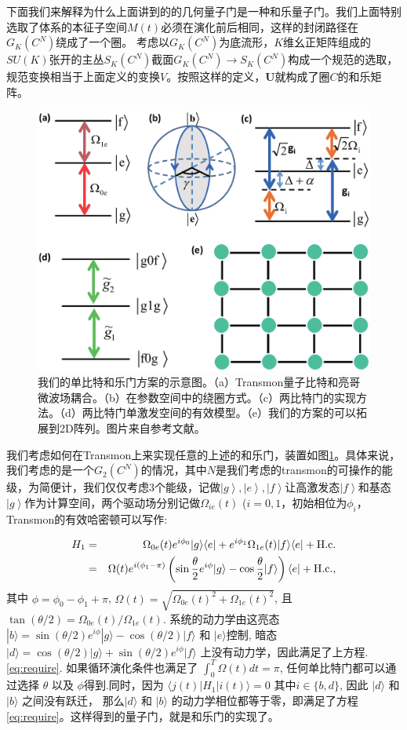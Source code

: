 \documentclass[supercite]{HustGraduPaper}
\newcommand{\ket}[1]{\left| #1 \right\rangle}
\begin{document}
下面我们来解释为什么上面讲到的的几何量子门是一种和乐量子门。我们上面特别选取了体系的本征子空间$M(t)$必须在演化前后相同，这样的封闭路径在$G_K(C^N)$绕成了一个圈。
考虑以$G_K(C^N)$为底流形，$K$维幺正矩阵组成的$SU(K)$张开的主丛$S_K(C^N)$截面$G_K(C^N)\to S_K(C^N)$构成一个规范的选取，规范变换相当于上面定义的变换$V$。按照这样的定义，$\mathbf{U}$就构成了圈$C$的和乐矩阵。
\begin{figure}
	\centering
	\includegraphics[width=0.7\linewidth]{Figures/transmon/setupnew}
	\caption{我们的单比特和乐门方案的示意图。（a）Transmon量子比特和亮哥微波场耦合。（b）在参数空间中的绕圈方式。（c）两比特门的实现方法。（d）两比特门单激发空间的有效模型。（e）我们的方案的可以拓展到2D阵列。图片来自参考文献\cite{hong2018implementing}。}
	\label{fig:setupnew}
\end{figure}

我们考虑如何在Transmon上来实现任意的上述的和乐门，装置如图\ref{fig:setupnew}。具体来说，我们考虑的是一个$G_2(C^N)$的情况，其中$N$是我们考虑的transmon的可操作的能级，为简便计，我们仅仅考虑$3$个能级，记做$\ket{g}, 
\ket{e},\ket{f}$让高激发态$\ket{f}$和基态$\ket{g}$作为计算空间，两个驱动场分别记做$\Omega_{ie}(t)$ ($i=0, 1$，初始相位为$\phi_i$，Transmon的有效哈密顿可以写作:

\begin{eqnarray} \label{h1}
H_{1} &=& \Omega_{0e}(t)e^{i\phi_0}|g\rangle\langle e|+
e^{i\phi_1}\Omega_{1e}(t)|f\rangle\langle e|  + \mathrm{H.c.}\\
&=&\Omega (t) e^{i(\phi_1-\pi)} \left(\sin\frac{\theta}{2}e^{i\phi}|g\rangle -\cos\frac{\theta}{2}|f\rangle\right)\langle e| + \mathrm{H.c.},\notag
\end{eqnarray}
其中 $\phi=\phi_0-\phi_1+\pi$, $\Omega(t)=\sqrt{\Omega_{0e}(t)^2+\Omega_{1e}(t)^2}$, 且$\tan(\theta/2)=\Omega_{0e}(t)/\Omega_{1e}(t)$. 系统的动力学由这亮态 $|b\rangle=\sin(\theta/2)e^{i\phi}|g\rangle-\cos(\theta/2)|f\rangle$ 和 $|e\rangle$控制, 暗态 $|d\rangle=\cos(\theta/2)|g\rangle+\sin(\theta/2)e^{i\phi}|f\rangle$ 上没有动力学，因此满足了上方程.\ref{eq:require}. 如果循环演化条件也满足了 $\int_0^T \Omega(t) dt=\pi$, 任何单比特门都可以通过选择 $\theta$ 以及 $\phi$得到.同时，因为 $\langle j(t)|H_1|i(t)\rangle=0$ 其中$i\in\{b, d\}$, 因此 $|d\rangle$ 和$|b\rangle$ 之间没有跃迁， 那么$|d\rangle$ 和 $|b\rangle$ 的动力学相位都等于零，即满足了方程\ref{eq:require}。这样得到的量子门，就是和乐门的实现了。
\end{document}

